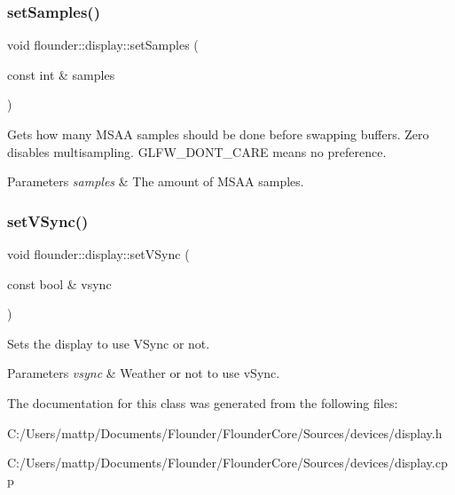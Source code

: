 \subsubsection{\texorpdfstring{set\+Samples()}{setSamples()}}
{\footnotesize\ttfamily void flounder\+::display\+::set\+Samples (\begin{DoxyParamCaption}\item[{const int \&}]{samples }\end{DoxyParamCaption})}



Gets how many M\+S\+AA samples should be done before swapping buffers. Zero disables multisampling. G\+L\+F\+W\+\_\+\+D\+O\+N\+T\+\_\+\+C\+A\+RE means no preference. 


\begin{DoxyParams}{Parameters}
{\em samples} & The amount of M\+S\+AA samples. \\
\hline
\end{DoxyParams}
\mbox{\label{classflounder_1_1display_a172501e1e99cde228d86fab59a3a636b}} 
\subsubsection{\texorpdfstring{set\+V\+Sync()}{setVSync()}}
{\footnotesize\ttfamily void flounder\+::display\+::set\+V\+Sync (\begin{DoxyParamCaption}\item[{const bool \&}]{vsync }\end{DoxyParamCaption})}



Sets the display to use V\+Sync or not. 


\begin{DoxyParams}{Parameters}
{\em vsync} & Weather or not to use v\+Sync. \\
\hline
\end{DoxyParams}


The documentation for this class was generated from the following files\+:\begin{DoxyCompactItemize}
\item 
C\+:/\+Users/mattp/\+Documents/\+Flounder/\+Flounder\+Core/\+Sources/devices/display.\+h\item 
C\+:/\+Users/mattp/\+Documents/\+Flounder/\+Flounder\+Core/\+Sources/devices/display.\+cpp\end{DoxyCompactItemize}
